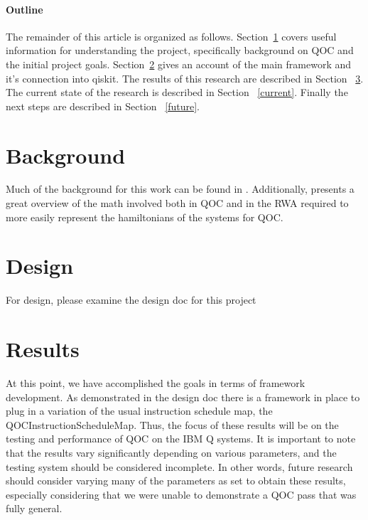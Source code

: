 \documentclass[12pt]{article}
\begin{document}
\paragraph{Outline}
The remainder of this article is organized as follows. Section~\ref{background}
covers useful information for understanding the project, specifically background
on QOC and the initial project goals. Section~\ref{design} gives an account of
the main framework and it's connection into qiskit. The results of this research
are described in Section ~\ref{results}. The current state of the research is
described in Section ~\ref{current}. Finally the next steps are described
in Section ~\ref{future}.


\section{Background}\label{background} 

Much of the background for this work can be found in \cite{oct-pulse-roadmap}.
Additionally, \cite{fisher_optimal_nodate} presents a great overview of the math
involved both in QOC and in the RWA required to more easily represent the
hamiltonians of the systems for QOC.


\section{Design}\label{design} 

For design, please examine the design doc for this project \cite{oct-design-doc}

\section{Results}\label{results}

At this point, we have accomplished the goals in terms of framework development.
As demonstrated in the design doc \cite{oct-design-doc} there is a framework in
place to plug in a variation of the usual instruction schedule map, the
QOCInstructionScheduleMap. Thus, the focus of these results will be on the
testing and performance of QOC on the IBM Q systems. It is important to note
that the results vary significantly depending on various parameters, and the
testing system should be considered incomplete. In other words, future research
should consider varying many of the parameters as set to obtain these results,
especially considering that we were unable to demonstrate a QOC pass that was
fully general.
\end{document}
